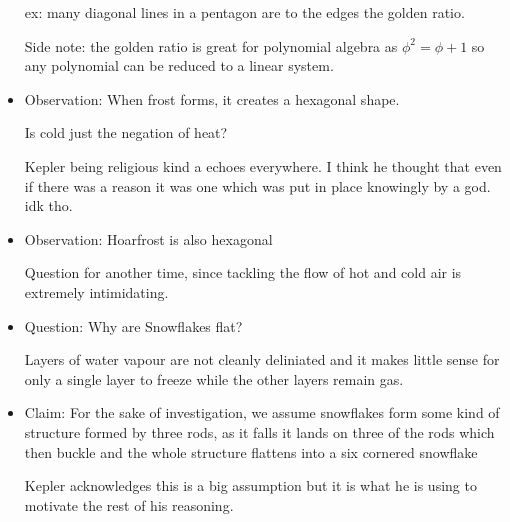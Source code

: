 \documentclass{report}
\begin{document}
\begin{itemize}
\begin{mdframed}
            ex: many diagonal lines in a pentagon are to
            the edges the golden ratio.
        \end{mdframed}
        \begin{mdframed}
            Side note: the golden ratio is great for polynomial
            algebra as $\phi^2 = \phi + 1$ so any polynomial
            can be reduced to a linear system.
        \end{mdframed}
    \item Observation: When frost forms, it creates a 
        hexagonal shape.
        \begin{mdframed}
            Is cold just the negation of heat?

            \begin{mdframed}
                Kepler being religious kind a echoes everywhere.
                I think he thought that even if there was
                a reason it was one which was put in
                place knowingly by a god. idk tho.
            \end{mdframed}
        \end{mdframed}
    \item Observation: Hoarfrost is also hexagonal
        \begin{mdframed}
            Question for another time, since tackling
            the flow of hot and cold air is extremely
            intimidating.
        \end{mdframed}
    \item Question: Why are Snowflakes flat?
        \begin{mdframed}
            Layers of water vapour are not cleanly
            deliniated and it makes little sense for
            only a single layer to freeze while the other layers
            remain gas.
        \end{mdframed}
    \item Claim: For the sake of investigation, we assume
        snowflakes form some kind of structure formed by
        three rods, as it falls it lands on three of the
        rods which then buckle and the whole structure flattens
        into a six cornered snowflake
        \begin{mdframed}
            Kepler acknowledges this is a big assumption
            but it is what he is using to motivate the rest
            of his reasoning.


\end{mdframed}
\end{itemize}
\end{document}
